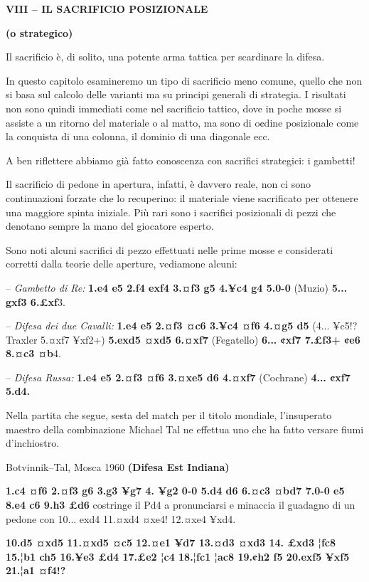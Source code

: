 \textbf{VIII -- IL SACRIFICIO POSIZIONALE}

\textbf{(o strategico)}

Il sacrificio è, di solito, una potente arma tattica per scardinare la
difesa.

In questo capitolo esamineremo un tipo di sacrificio meno comune, quello
che non si basa sul calcolo delle varianti ma su principi generali di
strategia. I risultati non sono quindi immediati come nel sacrificio
tattico, dove in poche mosse si assiste a un ritorno del materiale o al
matto, ma sono di o¢dine posizionale come la conquista di una colonna,
il dominio di una diagonale ecc.

A ben riflettere abbiamo già fatto conoscenza con sacrifici strategici:
i gambetti!

Il sacrificio di pedone in apertura, infatti, è davvero reale, non ci
sono continuazioni forzate che lo recuperino: il materiale viene
sacrificato per ottenere una maggiore spinta iniziale. Più rari sono i
sacrifici posizionali di pezzi che denotano sempre la mano del giocatore
esperto.

Sono noti alcuni sacrifici di pezzo effettuati nelle prime mosse e
considerati corretti dalla teorie delle aperture, vediamone alcuni:

-- \emph{Gambetto di Re:} \textbf{1.e4 e5 2.f4 exf4 3.¤f3 g5 4.¥c4 g4
5.0-0} (Muzio) \textbf{5... gxf3 6.£xf}3.

-- \emph{Difesa dei due Cavalli:} \textbf{1.e4 e5 2.¤f3 ¤c6 3.¥c4 ¤f6
4.¤g5 d5} (4... ¥c5!? Traxler 5.¤xf7 ¥xf2+) \textbf{5.exd5 ¤xd5 6.¤xf7}
(Fegatello) \textbf{6... ¢xf7 7.£f3+ ¢e6 8.¤c3 ¤b}4.

-- \emph{Difesa Russa:} \textbf{1.e4 e5 2.¤f3 ¤f6 3.¤xe5 d6 4.¤xf7}
(Cochrane) \textbf{4... ¢xf7 5.d4.}

Nella partita che segue, sesta del match per il titolo mondiale,
l'insuperato maestro della combinazione Michael Tal ne effettua uno che
ha fatto versare fiumi d'inchiostro.

Botvinnik--Tal, Mosca 1960 \textbf{(Difesa Est Indiana)}

\textbf{1.c4 ¤f6 2.¤f3 g6 3.g3 ¥g7 4. ¥g2 0-0 5.d4 d6 6.¤c3 ¤bd7 7.0-0
e5 8.e4 c6 9.h3 £d6} costringe il Pd4 a pronunciarsi e minaccia il
guadagno di un pedone con 10... exd4 11.¤xd4 ¤xe4! 12.¤xe4 ¥xd4.


\textbf{10.d5
¤xd5 11.¤xd5 ¤c5 12.¤e1 ¥d7 13.¤d3 ¤xd3 14. £xd3 ¦fc8 15.¦b1 ch5 16.¥e3
£d4 17.£e2 ¦c4 18.¦fc1 ¦ac8 19.¢h2 f5 20.exf5 ¥xf5 21.¦a1 ¤f4!?}

